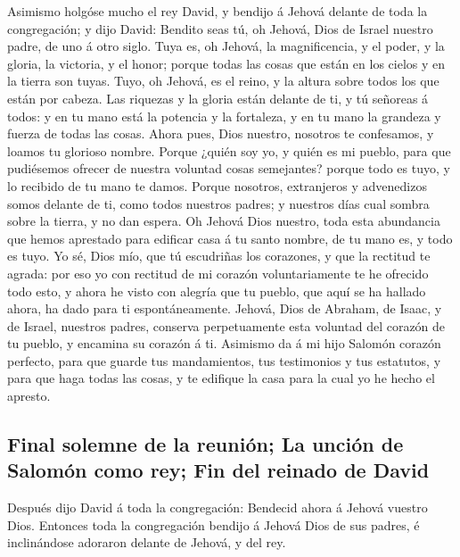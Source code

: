  Asimismo holgóse mucho el rey David, y bendijo á Jehová
delante de toda la congregación; y dijo David: Bendito seas tú, oh
Jehová, Dios de Israel nuestro padre, de uno á otro siglo. 
Tuya es, oh Jehová, la magnificencia, y el poder, y la gloria, la
victoria, y el honor; porque todas las cosas que están en los cielos y
en la tierra son tuyas. Tuyo, oh Jehová, es el reino, y la altura sobre
todos los que están por cabeza.  Las riquezas y la gloria
están delante de ti, y tú señoreas á todos: y en tu mano está la
potencia y la fortaleza, y en tu mano la grandeza y fuerza de todas las
cosas.  Ahora pues, Dios nuestro, nosotros te confesamos, y
loamos tu glorioso nombre.  Porque ¿quién soy yo, y quién
es mi pueblo, para que pudiésemos ofrecer de nuestra voluntad cosas
semejantes? porque todo es tuyo, y lo recibido de tu mano te damos.
 Porque nosotros, extranjeros y advenedizos somos delante
de ti, como todos nuestros padres; y nuestros días cual sombra sobre la
tierra, y no dan espera.  Oh Jehová Dios nuestro, toda esta
abundancia que hemos aprestado para edificar casa á tu santo nombre, de
tu mano es, y todo es tuyo.  Yo sé, Dios mío, que tú
escudriñas los corazones, y que la rectitud te agrada: por eso yo con
rectitud de mi corazón voluntariamente te he ofrecido todo esto, y ahora
he visto con alegría que tu pueblo, que aquí se ha hallado ahora, ha
dado para ti espontáneamente.  Jehová, Dios de Abraham, de
Isaac, y de Israel, nuestros padres, conserva perpetuamente esta
voluntad del corazón de tu pueblo, y encamina su corazón á ti.
 Asimismo da á mi hijo Salomón corazón perfecto, para que
guarde tus mandamientos, tus testimonios y tus estatutos, y para que
haga todas las cosas, y te edifique la casa para la cual yo he hecho el
apresto.

\hypertarget{final-solemne-de-la-reuniuxf3n-la-unciuxf3n-de-salomuxf3n-como-rey-fin-del-reinado-de-david}{%
\subsection{Final solemne de la reunión; La unción de Salomón como rey;
Fin del reinado de
David}\label{final-solemne-de-la-reuniuxf3n-la-unciuxf3n-de-salomuxf3n-como-rey-fin-del-reinado-de-david}}

 Después dijo David á toda la congregación: Bendecid ahora
á Jehová vuestro Dios. Entonces toda la congregación bendijo á Jehová
Dios de sus padres, é inclinándose adoraron delante de Jehová, y del
rey.

